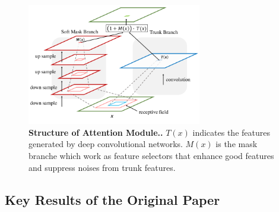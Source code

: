 \documentclass{article}
\newcommand{\mycaption}[2]{\caption[#1]{\textbf{#1.} #2}}
\begin{document}
\begin{multicols}{2}
\begin{figure}[H] 
\includegraphics[width=3in]{imgs/receptive_field.png}  
\mycaption{Structure of Attention Module.}{$T(x)$ indicates the features generated by deep convolutional networks. $M(x)$ is the mask branche which work as feature selectors that enhance good features and suppress noises from trunk features.}  
\label{fig:receptive_field}
\end{figure}

\subsection{Key Results of the Original Paper}


\end{multicols}
\end{document}
